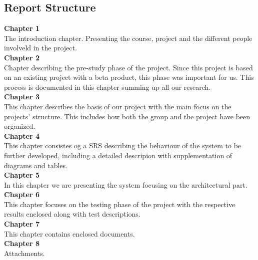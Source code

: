 \subsection{Report Structure}

\textbf{Chapter 1}\\
 The introduction chapter. Presenting the course, project and the different people involveld in the project.\\[20pt]
\textbf{Chapter 2}\\
Chapter describing the pre-study phase of the project. Since this project is based on an existing project with a beta product, this phase was important for us. This process is documented in this chapter summing up all our research. \\[20pt]
\textbf{Chapter 3}\\
This chapter describes the basis of our project with the main focus on the projects' structure. This includes how both the group and the project have been organized.\\[20pt]
\textbf{Chapter 4}\\
 This chapter consistes og a SRS describing the behaviour of the system to be further developed, including a detailed descripion with supplementation of diagrams and tables.\\[20pt]
\textbf{Chapter 5}\\
In this chapter we are presenting the system focusing on the architectural part.\\[20pt]
\textbf{Chapter 6}\\
This chapter focuses on the testing phase of the project with the respective results enclosed along with test descriptions.\\[20pt]
\textbf{Chapter 7}\\
 This chapter contains enclosed documents.\\[20pt]
 \textbf{Chapter 8}\\
Attachments.\\

